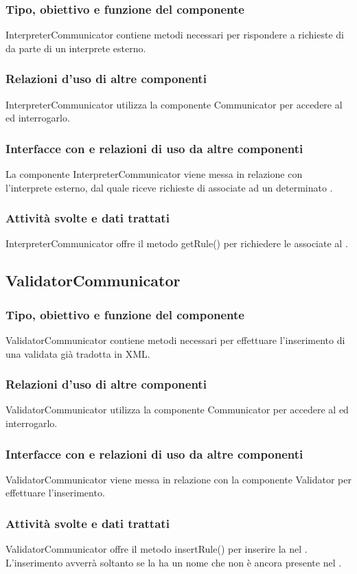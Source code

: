 \documentclass[11pt,titlepage,a4paper]{report}
\begin{document}
\subsubsection{Tipo, obiettivo e funzione del componente}
InterpreterCommunicator contiene metodi necessari per rispondere a richieste di \br da parte di un interprete esterno.
\subsubsection{Relazioni d'uso di altre componenti}
InterpreterCommunicator utilizza la componente Communicator per accedere al \re ed interrogarlo.
\subsubsection{Interfacce con e relazioni di uso da altre componenti}
La componente InterpreterCommunicator viene messa in relazione con l'interprete esterno, dal quale riceve richieste di \brs associate ad un determinato \bo.
\subsubsection{Attivit\`a svolte e dati trattati}
InterpreterCommunicator offre il metodo getRule() per richiedere le \br associate al \bo.

\subsection{ValidatorCommunicator}
\subsubsection{Tipo, obiettivo e funzione del componente}
ValidatorCommunicator contiene metodi necessari per effettuare l'inserimento di una \br validata gi\`a tradotta in XML.
\subsubsection{Relazioni d'uso di altre componenti}
ValidatorCommunicator utilizza la componente Communicator per accedere al \re ed interrogarlo.
\subsubsection{Interfacce con e relazioni di uso da altre componenti}
ValidatorCommunicator viene messa in relazione con la componente Validator per effettuare l'inserimento.
\subsubsection{Attivit\`a svolte e dati trattati}
ValidatorCommunicator offre il metodo insertRule() per inserire la \br nel \re. L'inserimento avverr\`a soltanto se la \br ha un nome che non \`e ancora presente nel \re.
\end{document}
